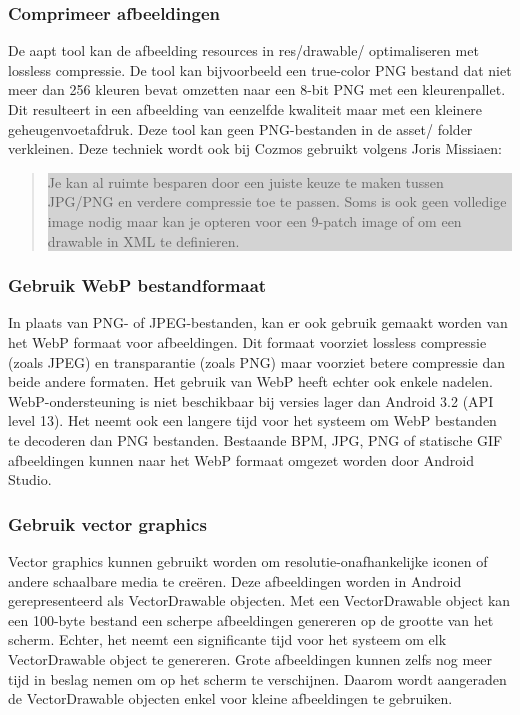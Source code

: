\subsubsection{Comprimeer afbeeldingen }
\label{sec:compressimages}
De aapt tool kan de afbeelding resources in res/drawable/ optimaliseren met lossless compressie. De tool kan bijvoorbeeld een true-color PNG bestand dat niet meer dan 256 kleuren bevat omzetten naar een 8-bit PNG met een kleurenpallet. Dit resulteert in een afbeelding van eenzelfde kwaliteit maar met een kleinere geheugenvoetafdruk. Deze tool kan geen PNG-bestanden in de asset/ folder verkleinen. Deze techniek wordt ook bij Cozmos gebruikt volgens Joris Missiaen: 
\begin{quote}
\colorbox{lightgray}{\parbox{350px}{Je kan al ruimte besparen door een juiste keuze te maken tussen JPG/PNG en verdere compressie toe te passen. Soms is ook geen volledige image nodig maar kan je opteren voor een 9-patch image of om een drawable in XML te definieren.}}
\end{quote}

\subsubsection{Gebruik WebP bestandformaat }
\label{sec:webp}
In plaats van PNG- of JPEG-bestanden, kan er ook gebruik gemaakt worden van het WebP formaat voor afbeeldingen. Dit formaat voorziet lossless compressie (zoals JPEG) en transparantie (zoals PNG) maar voorziet betere compressie dan beide andere formaten. Het gebruik van WebP heeft echter ook enkele nadelen. WebP-ondersteuning is niet beschikbaar bij versies lager dan Android 3.2 (API level 13). Het neemt ook een langere tijd voor het systeem om WebP bestanden te decoderen dan PNG bestanden. Bestaande BPM, JPG, PNG of statische GIF afbeeldingen kunnen naar het WebP formaat omgezet worden door Android Studio. 

\subsubsection{Gebruik vector graphics }
\label{sec:vectorgraphics}
Vector graphics kunnen gebruikt worden om resolutie-onafhankelijke iconen of andere schaalbare media te creëren. Deze afbeeldingen worden in Android gerepresenteerd als VectorDrawable objecten. Met een VectorDrawable object kan een 100-byte bestand een scherpe afbeeldingen genereren op de grootte van het scherm. 
Echter, het neemt een significante tijd voor het systeem om elk VectorDrawable object te genereren. Grote afbeeldingen kunnen zelfs nog meer tijd in beslag nemen om op het scherm te verschijnen. Daarom wordt aangeraden de VectorDrawable objecten enkel voor kleine afbeeldingen te gebruiken. 
